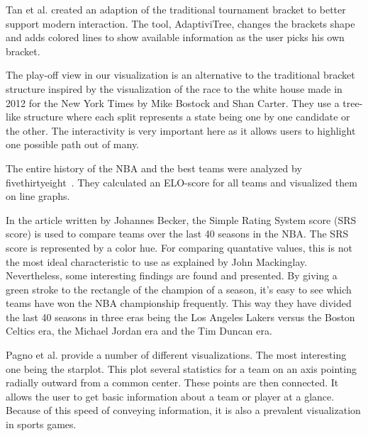\documentclass[]{sigchi}
\begin{document}
Tan et al. created an adaption of the traditional tournament bracket to better
support modern interaction\cite{adaptivitree}. The tool, AdaptiviTree, changes
the brackets shape and adds colored lines to show available information as the
user picks his own bracket.

The play-off view in our visualization is an alternative to the traditional bracket structure inspired by the
visualization of the race to the white house made in 2012 for the New York Times
by Mike Bostock and Shan Carter\cite{whitehousepath}. They use a tree-like
structure where each split represents a state being one by one candidate or the
other. The interactivity is very important here as it allows users to highlight
one possible path out of many.

The entire history of the NBA and the best teams were analyzed by
fivethirtyeight~\cite{fivethirtyeight}. They calculated an ELO-score\cite{elorating} 
for all teams and visualized them on line graphs. 

In the article written by Johannes Becker\cite{nbaempires}, the Simple Rating System 
score (SRS score) is used to compare teams over the last 40 seasons in the NBA. The 
SRS score is represented by a color hue. For comparing quantative values, this is 
not the most ideal characteristic to use as explained by John Mackinglay\cite{automatingdesign}. Nevertheless, some interesting findings are found and presented. By giving a green stroke to the rectangle of the champion of a season, 
it's easy to see which teams have won the NBA championship frequently. This way 
they have divided the last 40 seasons in three eras being the Los Angeles Lakers 
versus the Boston Celtics era, the Michael Jordan era and the Tim Duncan era. 

Pagno et al. provide a number of different visualizations\cite{starplots}. The
most interesting one being the starplot. This plot several statistics for a team on
an axis pointing radially outward from a common center. These points are then
connected. It allows the user to get basic information about a team or player at
a glance. Because of this speed of conveying information, it is also a prevalent
visualization in sports games.



\end{document}
